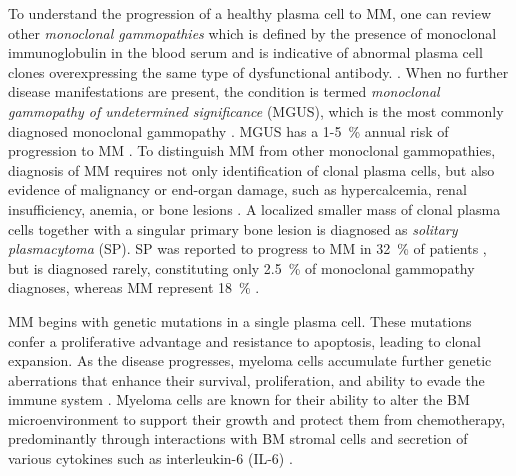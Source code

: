 To understand the progression of a healthy plasma cell to MM, one can review
other \emph{monoclonal gammopathies} which is defined by the presence of
monoclonal immunoglobulin in the blood serum and is indicative of abnormal
plasma cell clones overexpressing the same type of dysfunctional antibody.
\cite{kyleMonoclonalGammopathyUndetermined1997,
fermandMonoclonalGammopathyClinical2018}. When no further disease manifestations
are present, the condition is termed \emph{monoclonal gammopathy of undetermined
significance} (MGUS), which is the most commonly diagnosed monoclonal gammopathy
\cite{kyleMonoclonalGammopathyUndetermined1997}. MGUS has a 1-\SI{5}{\percent}
annual risk of progression to MM \cite{rajkumarInternationalMyelomaWorking2014}.
To distinguish MM from other monoclonal gammopathies, diagnosis of MM requires
not only identification of clonal plasma cells, but also evidence of malignancy
or end-organ damage, such as hypercalcemia, renal insufficiency, anemia, or bone
lesions \cite{rajkumarInternationalMyelomaWorking2014}. A localized
smaller mass of clonal plasma
cells together with a singular primary bone lesion is diagnosed as
\emph{solitary plasmacytoma} (SP). SP was reported to progress to MM in
\SI{32}{\percent} of patients
\cite{thumallapallySolitaryPlasmacytomaPopulationbased2017}, but is diagnosed
rarely, constituting only \SI{2.5}{\percent} of monoclonal gammopathy diagnoses,
whereas MM represent \SI{18}{\percent}
\cite{kyleMonoclonalGammopathyUndetermined1997}. 







MM begins with genetic mutations in a single plasma cell. These
mutations confer a proliferative advantage and resistance to apoptosis, leading
to clonal expansion. As the disease progresses, myeloma cells accumulate further
genetic aberrations that enhance their survival, proliferation, and ability to
evade the immune system \cite{hideshimaUnderstandingMultipleMyeloma2007}.
Myeloma cells are known for their ability to alter the BM microenvironment to
support their growth and protect them from chemotherapy, predominantly through
interactions with BM stromal cells and secretion of various cytokines such as
interleukin-6 (IL-6) \cite{frassanitoAutocrineInterleukin6Production2001}.

